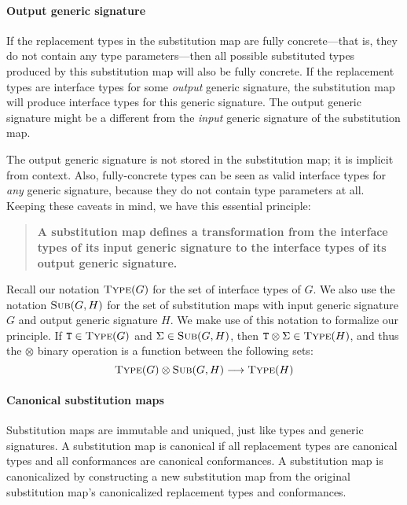 \documentclass[../generics]{subfiles}
\begin{document}
\paragraph{Output generic signature}
%
If the replacement types in the substitution map are fully concrete---that is, they do not contain any type parameters---then all possible substituted types produced by this substitution map will also be fully concrete. If the replacement types are interface types for some \emph{output} generic signature, the substitution map will produce interface types for this generic signature. The output generic signature might be a different from the \emph{input} generic signature of the substitution map. 

The output generic signature is not stored in the substitution map; it is implicit from context. Also, fully-concrete types can be seen as valid interface types for \emph{any} generic signature, because they do not contain type parameters at all. Keeping these caveats in mind, we have this essential principle:
\begin{quote}
\textbf{A substitution map defines a transformation from the interface types of its input generic signature to the interface types of its output generic signature.}
\end{quote}
Recall our notation $\textsc{Type}({G})$ for the set of interface types of $G$. We also use the notation $\textsc{Sub}({G, H})$ for the set of substitution maps with input generic signature $G$ and output generic signature $H$. We make use of this notation to formalize our principle. If $\texttt{T}\in\textsc{Type}({G})$ and $\Sigma\in\textsc{Sub}({G, H})$, then $\texttt{T}\otimes\Sigma\in\textsc{Type}({H})$, and thus the $\otimes$ binary operation is a function between the following sets:
\[\textsc{Type}({G})\otimes\textsc{Sub}({G, H})\longrightarrow\textsc{Type}({H})\]

\paragraph{Canonical substitution maps}
%
%
%
%
Substitution maps are immutable and uniqued, just like types and generic signatures. A substitution map is canonical if all replacement types are canonical types and all conformances are canonical conformances. A substitution map is canonicalized by constructing a new substitution map from the original substitution map's canonicalized replacement types and conformances.
\end{document}
